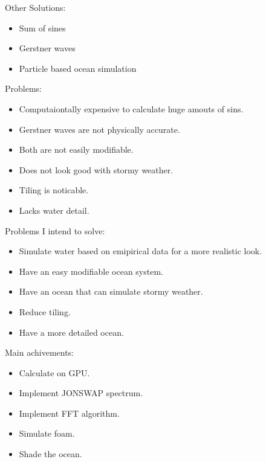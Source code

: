 
Other Solutions:
\begin{itemize}
    \item Sum of sines
    \item Gerstner waves
    \item Particle based ocean simulation
\end{itemize}

Problems:
\begin{itemize}
    \item Computaiontally expensive to calculate huge amouts of sins.
    \item Gerstner waves are not physically accurate.
    \item Both are not easily modifiable.
    \item Does not look good with stormy weather.
    \item Tiling is noticable.
    \item Lacks water detail.
\end{itemize}

Problems I intend to solve:
\begin{itemize}
    \item Simulate water based on emipirical data for a more realistic look.
    \item Have an easy modifiable ocean system.
    \item Have an ocean that can simulate stormy weather.
    \item Reduce tiling.
    \item Have a more detailed ocean.
\end{itemize}

Main achivements:
\begin{itemize}
    \item Calculate on GPU.
    \item Implement JONSWAP spectrum.
    \item Implement FFT algorithm.
    \item Simulate foam.
    \item Shade the ocean.
\end{itemize}